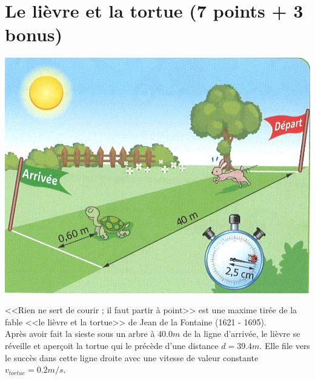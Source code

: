 \section{Le lièvre et la tortue (7 points + 3 bonus)}

\begin{center}
	\includegraphics[scale=1.25]{lievre}
\end{center}

<<Rien ne sert de courir ; il faut partir à point>> est une maxime tirée de la fable <<le lièvre et la tortue>> de Jean de la Fontaine (1621 - 1695).\\


Après avoir fait la sieste sous un arbre à $\num{40.0}  m$  de la ligne d'arrivée, le lièvre se réveille et aperçoit la tortue qui le précède d'une distance $d = \num{39.4} m$. Elle file vers le succès dans cette ligne droite avec une vitesse de valeur constante $v_{tortue} = \num{0.2} m/s $.

